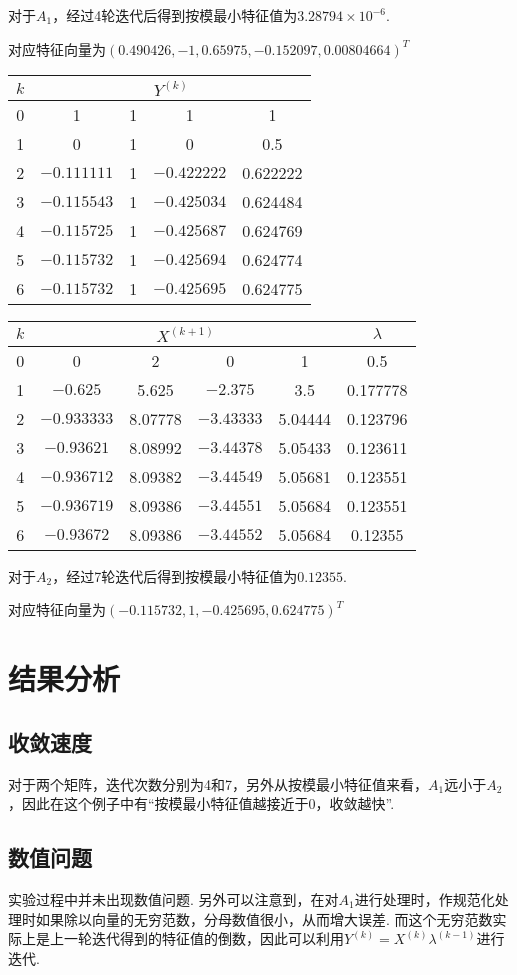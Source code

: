 \documentclass[UTF8]{ctexart}
\begin{document}
对于$A_1$，经过4轮迭代后得到按模最小特征值为$3.28794\times10^{-6}$.

对应特征向量为$(0.490426, -1, 0.65975, -0.152097, 0.00804664)^T$

\begin{table}[H]
  \centering
  \begin{tabular}{c|cccc}
    \hline\hline
    $k$ & \multicolumn{4}{c}{$Y^{(k)}$} \\
    \hline
    0 & 1 & 1 & 1 & 1 \\
    1 & 0 & 1 & 0 & 0.5 \\
    2 & $-0.111111$ & 1 & $-0.422222$ & 0.622222 \\
    3 & $-0.115543$ & 1 & $-0.425034$ & 0.624484 \\
    4 & $-0.115725$ & 1 & $-0.425687$ & 0.624769 \\
    5 & $-0.115732$ & 1 & $-0.425694$ & 0.624774 \\
    6 & $-0.115732$ & 1 & $-0.425695$ & 0.624775 \\
    \hline\hline 
  \end{tabular}
\end{table}
\begin{table}[H]
  \centering
  \begin{tabular}{c|cccc|c}
    \hline\hline
    $k$ & \multicolumn{4}{c|}{$X^{(k+1)}$} & $\lambda$\\
    \hline
    0 & 0 & 2 & 0 & 1 & 0.5 \\
    1 & $-0.625$ & 5.625 & $-2.375$ & 3.5 & 0.177778 \\
    2 & $-0.933333$ & 8.07778 & $-3.43333$ & 5.04444 & 0.123796 \\
    3 & $-0.93621$ & 8.08992 & $-3.44378$ & 5.05433 & 0.123611 \\
    4 & $-0.936712$ & 8.09382 & $-3.44549$ & 5.05681 & 0.123551 \\
    5 & $-0.936719$ & 8.09386 & $-3.44551$ & 5.05684 & 0.123551 \\
    6 & $-0.93672$ & 8.09386 & $-3.44552$ & 5.05684 & 0.12355 \\
    \hline\hline 
  \end{tabular}
\end{table}

对于$A_2$，经过7轮迭代后得到按模最小特征值为$0.12355$.

对应特征向量为$(-0.115732, 1, -0.425695, 0.624775)^T$
\section{结果分析}
\subsection{收敛速度}
对于两个矩阵，迭代次数分别为4和7，另外从按模最小特征值来看，$A_1$远小于$A_2$，因此在这个例子中有“按模最小特征值越接近于0，收敛越快”.
\subsection{数值问题}
实验过程中并未出现数值问题. 另外可以注意到，在对$A_1$进行处理时，作规范化处理时如果除以向量的无穷范数，分母数值很小，从而增大误差. 而这个无穷范数实际上是上一轮迭代得到的特征值的倒数，因此可以利用$Y^{(k)} = X^{(k)}\lambda^{(k-1)}$进行迭代.

\end{document}
